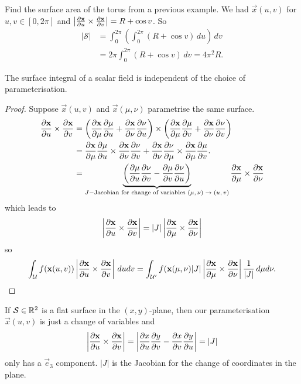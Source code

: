 \documentclass[10pt, a4paper]{article}
\begin{document}
\begin{example}
    Find the surface area of the torus from a previous example.
    We had $\vec{x}(u, v)$ for $u, v \in [0, 2\pi]$ and $\left|\pd[\vec{x}]{u} \times \pd[\vec{x}]{v}\right| = R + \cos{v}$.
    So
    \begin{align*}
        |\mathcal{S}| &= \int_{0}^{2\pi}\left(\int_{0}^{2\pi}(R + \cos{v})\,du\right)\,dv \\
        &= 2\pi\int_{0}^{2\pi}(R + \cos{v})\,dv = 4\pi ^ 2R.
    \end{align*}
\end{example}

\begin{proposition}
    The surface integral of a scalar field is independent of the choice of parameterisation.

    \begin{proof}
        Suppose $\vec{x}(u, v)$ and $\vec{x}(\mu, \nu)$ parametrise the same surface.
        \begin{align*}
            \pd[\vec{x}]{u} \times \pd[\vec{x}]{v} &= \left(\pd[\vec{x}]{\mu}\pd[\mu]{u} + \pd[\vec{x}]{\nu}\pd[\nu]{u}\right) \times \left(\pd[\vec{x}]{\mu}\pd[\mu]{v} + \pd[\vec{x}]{\nu}\pd[\nu]{v}\right) \\
            &= \pd[\vec{x}]{\mu}\pd[\mu]{u} \times \pd[\vec{x}]{\nu}\pd[\nu]{v} + \pd[\vec{x}]{\nu}\pd[\nu]{\mu} \times \pd[\vec{x}]{\mu}\pd[\mu]{v}. \\
            &= \underbrace{\left(\pd[\mu]{u}\pd[\nu]{v} - \pd[\mu]{v}\pd[\nu]{u}\right)}_{J - \text{Jacobian for change of variables $(\mu, \nu) \to (u, v)$}}\pd[\vec{x}]{\mu} \times \pd[\vec{x}]{\nu}
        \end{align*}
        which leads to
        \[
        \left|\pd[\vec{x}]{u} \times \pd[\vec{x}]{v}\right| = |J|\left|\pd[\vec{x}]{\mu} \times \pd[\vec{x}]{\nu}\right|
        \]
        so
        \[
        \int_{\mathcal{U}}f(\vec{x}(u, v))\left|\pd[\vec{x}]{u} \times \pd[\vec{x}]{v}\right|\,dudv = \int_{\mathcal{U}'}f(\vec{x}(\mu, \nu)|J|\left|\pd[\vec{x}]{\mu} \times \pd[\vec{x}]{\nu}\right|\frac{1}{|J|}\,d\mu d\nu.
        \]
    \end{proof}
\end{proposition}

\begin{remark}
    If $\mathcal{S} \in \R ^ 2$ is a flat surface in the $(x, y)$-plane,
    then our parameterisation $\vec{x}(u, v)$ is just a change of variables and
    \[
    \left|\pd[\vec{x}]{u} \times \pd[\vec{x}]{v}\right| = \left|\pd[x]{u}\pd[y]{v} - \pd[x]{v}\pd[y]{u}\right| = |J|
    \]
    only has a $\vec{e}_3$ component.
    $|J|$ is the Jacobian for the change of coordinates in the plane.
\end{remark}
\end{document}
